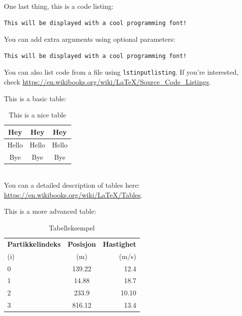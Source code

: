 \documentclass[reprint,english,notitlepage]{revtex4-2}
\begin{document}
One last thing, this is a code listing:
\begin{lstlisting}
This will be displayed with a cool programming font!
\end{lstlisting}
You can add extra arguments using optional parameters:
\begin{lstlisting}[morekeywords={cool}]
This will be displayed with a cool programming font!
\end{lstlisting}
You can also list code from a file using \texttt{lstinputlisting}. If you're interested, check \url{https://en.wikibooks.org/wiki/LaTeX/Source_Code_Listings}.

This is a basic table:
\begin{table}[h]  %
\caption{This is a nice table}\label{table}
\begin{tabular}{|c|c|c|} %
\hline                    %
Hey & Hey & Hey  \\
\hline
Hello & Hello & Hello \\
\hline
Bye & Bye & Bye \\
\hline
\end{tabular}
\end{table}\\
You can a detailed description of tables here: \url{https://en.wikibooks.org/wiki/LaTeX/Tables}.

This is a more advanced table:
\begin{table}[h!] %
  \begin{center}
    \caption{Tabelleksempel} %
    \label{tab:results}
    \begin{tabular}{l|c|r} %
      \textbf{Partikkelindeks} & \textbf{Posisjon} & \textbf{Hastighet}\\ %
      (i) & (m) & (m/s)\\ %
      \hline %
      0 & 139.22 & 12.4\\
      1 & 14.88 & 18.7\\
      2 & 233.9 & 10.10\\
      3 & 816.12 & 13.4\\
      \hline
    \end{tabular}
  \end{center}
\end{table}
\end{document}
